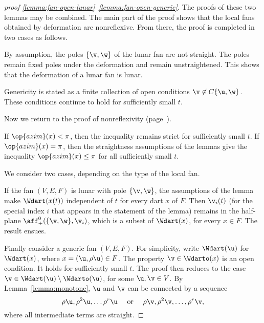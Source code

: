 \begin{proof}[proof \eqref{lemma:fan-open-lunar}~\eqref{lemma:fan-open-generic}] 
  The proofs of these two lemmas may be combined.  The main part of
  the proof shows that the local fans obtained by deformation are
  nonreflexive.  From there, the proof is completed in two cases as
  follows.

   By assumption, the poles $\{\v,\w\}$ of the lunar fan are not straight.
  The poles
  remain fixed poles under the deformation and remain unstraightened.  This
  shows that the deformation of a lunar fan is lunar.

   Genericity is stated as a finite collection of
open conditions $\v\not\in
  C\{\u,\w\}$.  These conditions continue to hold for sufficiently
  small $t$.

Now we return to the proof of nonreflexivity (page~\pageref{def:convex-local}).

 If $\op{azim}(x)<\pi$, then the inequality remains
strict for sufficiently small $t$.  If $\op{azim}(x)=\pi$, then the
straightness assumptions of the lemmas give the inequality 
$\op{azim}(x)\le\pi$ for all sufficiently small $t$.

 We consider two cases, depending on the type of
the local fan.


If the fan $(V,E,F)$ is lunar with pole $\{\v,\w\}$, the assumptions
of the lemma make $\Wdart(x(t))$ independent of $t$ for every dart $x$
of $F$.  Then $\v_i(t)$ (for the special index $i$ that appears in the
statement of the lemma) remains in the half-plane
$\aff_+^0(\{\v,\w\},\v_i)$, which is a subset of $\Wdart(x)$,
for every $x\in F$.  The result ensues.

Finally consider a generic fan $(V,E,F)$.  For simplicity, write
$\Wdart(\u)$ for $\Wdart(x)$, where $x=(\u,\rho\u)\in F$.  The
property $\v\in \Wdarto(x)$ is an open condition.  It holds for
sufficiently small $t$.  The proof then reduces to the case
$\v\in \Wdart(\u)\setminus \Wdarto(\u)$, for some $\u,\v\in V$.  By
Lemma~\ref{lemma:monotone}, $\u$ and $\v$ can be connected by a
sequence
\[
\rho\u, \rho^2\u,\ldots \rho^r\u\quad\text{ or }\quad 
\rho\v, \rho^2\v,\ldots,\rho^r\v,
\]
where all intermediate terms are straight.


\end{proof}
